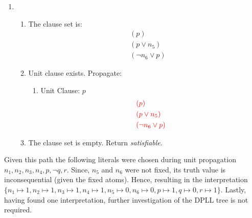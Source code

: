 \documentclass[11pt,a4paper]{article}
\begin{document}
\begin{enumerate}
\item 
\begin{enumerate}
\item The clause set is:
\begin{align*}
& (p) \\
& ( p \lor n_5) \\
& (\neg n_6 \lor p)
\end{align*}
\item Unit clause exists. Propagate:
\begin{enumerate}
\item Unit Clause:  $p$
\begin{align*}
& \textcolor{red}{(p)} \\
& \textcolor{red}{( p \lor n_5)} \\
& \textcolor{red}{(\neg n_6 \lor p)} \\
\end{align*}
\end{enumerate}
\item The clause set is empty. Return \emph{satisfiable}.
\end{enumerate}

\end{enumerate}
 Given this path the following literals were chosen during unit propagation $n_1, n_2, n_3, n_4, p, \neg q, r$. Since, $n_5$ and $n_6$ were not fixed, its truth value is inconsequential (given the fixed atoms). Hence, resulting in the interpretation $\{n_1 \mapsto 1, n_2 \mapsto 1, n_3 \mapsto 1, n_4 \mapsto 1, n_5 \mapsto 0, n_6 \mapsto 0, p \mapsto 1, q \mapsto 0, r\mapsto 1\}$. Lastly, having found one interpretation, further investigation of the DPLL tree is not required. \\
\end{document}
